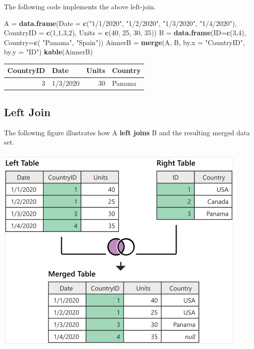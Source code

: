 \documentclass[
]{book}
\newenvironment{Shaded}{\begin{snugshade}}{\end{snugshade}}
\newcommand{\AttributeTok}[1]{\textcolor[rgb]{0.13,0.29,0.53}{#1}}
\newcommand{\DecValTok}[1]{\textcolor[rgb]{0.00,0.00,0.81}{#1}}
\newcommand{\FunctionTok}[1]{\textcolor[rgb]{0.13,0.29,0.53}{\textbf{#1}}}
\newcommand{\NormalTok}[1]{#1}
\newcommand{\OtherTok}[1]{\textcolor[rgb]{0.56,0.35,0.01}{#1}}
\newcommand{\StringTok}[1]{\textcolor[rgb]{0.31,0.60,0.02}{#1}}
\begin{document}
The following code implements the above left-join.

\begin{Shaded}
\begin{Highlighting}[]
\NormalTok{A }\OtherTok{=} \FunctionTok{data.frame}\NormalTok{(}\AttributeTok{Date =} \FunctionTok{c}\NormalTok{(}\StringTok{"1/1/2020"}\NormalTok{, }\StringTok{"1/2/2020"}\NormalTok{, }\StringTok{"1/3/2020"}\NormalTok{, }\StringTok{"1/4/2020"}\NormalTok{),}
               \AttributeTok{CountryID =} \FunctionTok{c}\NormalTok{(}\DecValTok{1}\NormalTok{,}\DecValTok{1}\NormalTok{,}\DecValTok{3}\NormalTok{,}\DecValTok{2}\NormalTok{),}
               \AttributeTok{Units =} \FunctionTok{c}\NormalTok{(}\DecValTok{40}\NormalTok{, }\DecValTok{25}\NormalTok{, }\DecValTok{30}\NormalTok{, }\DecValTok{35}\NormalTok{))}
\NormalTok{B }\OtherTok{=} \FunctionTok{data.frame}\NormalTok{(}\AttributeTok{ID=}\FunctionTok{c}\NormalTok{(}\DecValTok{3}\NormalTok{,}\DecValTok{4}\NormalTok{),}
               \AttributeTok{Country=}\FunctionTok{c}\NormalTok{( }\StringTok{"Panama"}\NormalTok{, }\StringTok{"Spain"}\NormalTok{))}
\NormalTok{AinnerB }\OtherTok{=} \FunctionTok{merge}\NormalTok{(A, B, }\AttributeTok{by.x =} \StringTok{"CountryID"}\NormalTok{, }\AttributeTok{by.y =} \StringTok{"ID"}\NormalTok{)}
\FunctionTok{kable}\NormalTok{(AinnerB)}
\end{Highlighting}
\end{Shaded}

\begin{tabular}{r|l|r|l}
\hline
CountryID & Date & Units & Country\\
\hline
3 & 1/3/2020 & 30 & Panama\\
\hline
\end{tabular}

\hfill\break

\hypertarget{left-join}{%
\subsection{Left Join}\label{left-join}}

The following figure illustrates how A \textbf{left joins} B and the resulting merged data set.

\begin{center}\includegraphics[width=0.7\linewidth]{img05/w5-leftJoin} \end{center}
\end{document}
